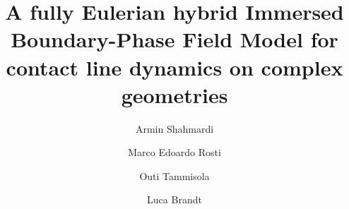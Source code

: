 \documentclass[review]{elsarticle}
\begin{document}
\begin{frontmatter}

\title{A fully Eulerian hybrid Immersed Boundary-Phase Field Model for contact line dynamics on complex geometries}


\author[Stoccolma]{Armin Shahmardi}
\author[Okinawa]{Marco Edoardo Rosti}
\author[Stoccolma]{Outi  Tammisola}
\author[Stoccolma,Norway]{Luca Brandt}

%


\end{frontmatter}
\end{document}

